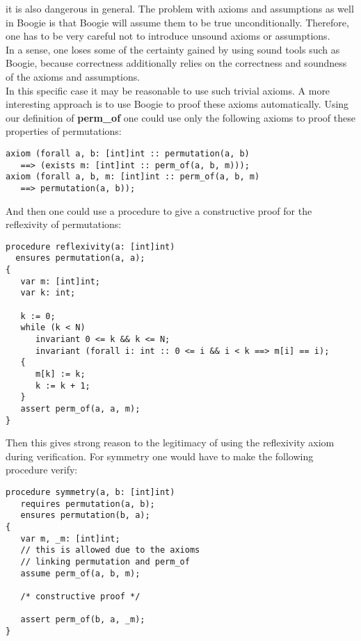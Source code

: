 \documentclass{report}
\begin{document}
it is also dangerous in general. The problem with axioms and assumptions as well
in Boogie is that Boogie will assume them to be true unconditionally. Therefore,
one has to be very careful not to introduce unsound axioms or assumptions.\\
In a sense, one loses some of the certainty gained by using sound tools such as
Boogie, because correctness additionally relies on the correctness and soundness
of the axioms and assumptions.\\
In this specific case it may be reasonable to use such trivial axioms. A more
interesting approach is to use Boogie to proof these axioms automatically. Using our
definition of \textbf{perm\_of} one could use only the following axioms to
proof these properties of permutations:
\begin{lstlisting}
axiom (forall a, b: [int]int :: permutation(a, b)
   ==> (exists m: [int]int :: perm_of(a, b, m)));
axiom (forall a, b, m: [int]int :: perm_of(a, b, m)
   ==> permutation(a, b));
\end{lstlisting}

And then one could use a procedure to give a constructive proof for the
reflexivity of permutations:
\begin{lstlisting}
procedure reflexivity(a: [int]int)
  ensures permutation(a, a);
{
   var m: [int]int;
   var k: int;

   k := 0;
   while (k < N)
      invariant 0 <= k && k <= N;
      invariant (forall i: int :: 0 <= i && i < k ==> m[i] == i);
   {
      m[k] := k;
      k := k + 1;
   }
   assert perm_of(a, a, m);
}
\end{lstlisting}

Then this gives strong reason to the legitimacy of using the reflexivity axiom
during verification. For symmetry one would have to make the following procedure
verify:
\begin{lstlisting}
procedure symmetry(a, b: [int]int)
   requires permutation(a, b);
   ensures permutation(b, a);
{
   var m, _m: [int]int;
   // this is allowed due to the axioms
   // linking permutation and perm_of
   assume perm_of(a, b, m);
                 
   /* constructive proof */
                     
   assert perm_of(b, a, _m);
}
\end{lstlisting}
\end{document}
